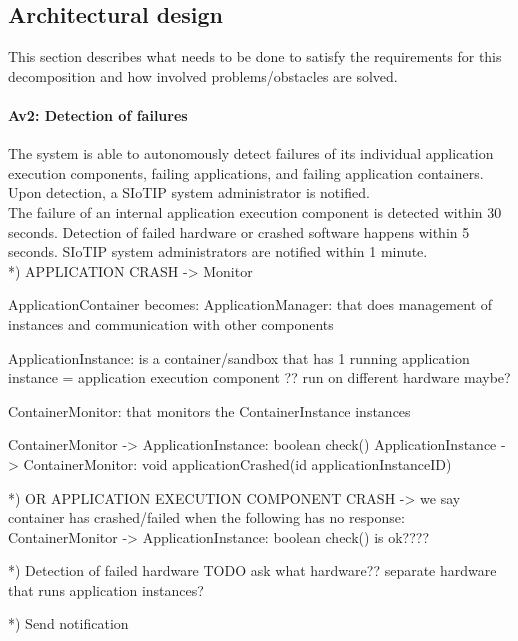\subsection{Architectural design}
    This section describes what needs to be done to satisfy the requirements for
    this decomposition and how involved problems/obstacles are solved.

    \paragraph{Av2: Detection of failures}
        The system is able to autonomously detect failures of its individual
        application execution components, failing applications, and failing application containers. \\
        Upon detection, a SIoTIP system administrator is notified. \\
        The failure of an internal application execution component is detected within 30 seconds.
        Detection of failed hardware or crashed software happens within 5 seconds.
        SIoTIP system administrators are notified within 1 minute.\\

        *) APPLICATION CRASH
        -> Monitor

        ApplicationContainer becomes:
            ApplicationManager: that does management of instances and communication
            with other components

            ApplicationInstance: is a container/sandbox that has
            1 running application instance
            = application execution component
            ?? run on different hardware maybe?

            ContainerMonitor: that monitors the ContainerInstance instances

        ContainerMonitor -> ApplicationInstance: boolean check()
        ApplicationInstance -> ContainerMonitor: void applicationCrashed(id applicationInstanceID)

        *) OR APPLICATION EXECUTION COMPONENT CRASH
        -> we say container has crashed/failed when the following has no response:
        ContainerMonitor -> ApplicationInstance: boolean check()
        is ok????

        *) Detection of failed hardware
        TODO ask what hardware?? separate hardware that runs application instances?

        *) Send notification

